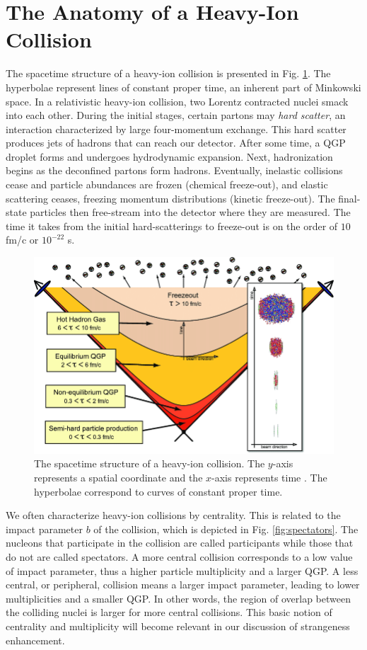 \documentclass[../main.tex]{subfiles}
\begin{document}
\section{The Anatomy of a Heavy-Ion Collision}
The spacetime structure of a heavy-ion collision is presented in Fig. \ref{fig:spacetime}. The hyperbolae represent lines of constant proper time, an inherent part of Minkowski space. In a relativistic heavy-ion collision, two Lorentz contracted nuclei smack into each other. During the initial stages, certain partons may \textit{hard scatter}, an interaction characterized by large four-momentum exchange. This hard scatter produces jets of hadrons that can reach our detector. After some time, a QGP droplet forms and undergoes hydrodynamic expansion. Next, hadronization begins as the deconfined partons form hadrons. Eventually, inelastic collisions cease and particle abundances are frozen (chemical freeze-out), and elastic scattering ceases, freezing momentum distributions (kinetic freeze-out). The final-state particles then free-stream into the detector where they are measured. The time it takes from the initial hard-scatterings to freeze-out is on the order of $10$ fm/c or $10^{-22}$ s. 

\begin{figure}[h]
    \centering
    \includegraphics[scale=0.3]{introduction/figs/spacetime.png}
    \caption{The spacetime structure of a heavy-ion collision. The $y$-axis represents a spatial coordinate and the $x$-axis represents time \cite{Strickland:2014pga}. The hyperbolae correspond to curves of constant proper time.}
    \label{fig:spacetime}
\end{figure}

We often characterize heavy-ion collisions by centrality. This is related to the impact parameter $b$ of the collision, which is depicted in Fig. \ref{fig:spectators}. The nucleons that participate in the collision are called participants while those that do not are called spectators. A more central collision corresponds to a low value of impact parameter, thus a higher particle multiplicity and a larger QGP.  A less central, or peripheral, collision means a larger impact parameter, leading to lower multiplicities and a smaller QGP. In other words, the region of overlap between the colliding nuclei is larger for more central collisions. This basic notion of centrality and multiplicity will become relevant in our discussion of strangeness enhancement. 
\end{document}
